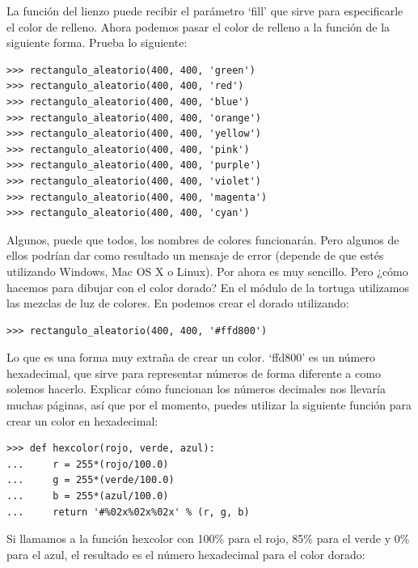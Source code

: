 La función  del lienzo puede recibir el parámetro `fill' que sirve para especificarle el color de relleno.  Ahora podemos pasar el color de relleno a la función de la siguiente forma. Prueba lo siguiente:

\begin{listing}
\begin{verbatim}
>>> rectangulo_aleatorio(400, 400, 'green')
>>> rectangulo_aleatorio(400, 400, 'red')
>>> rectangulo_aleatorio(400, 400, 'blue')
>>> rectangulo_aleatorio(400, 400, 'orange')
>>> rectangulo_aleatorio(400, 400, 'yellow')
>>> rectangulo_aleatorio(400, 400, 'pink')
>>> rectangulo_aleatorio(400, 400, 'purple')
>>> rectangulo_aleatorio(400, 400, 'violet')
>>> rectangulo_aleatorio(400, 400, 'magenta')
>>> rectangulo_aleatorio(400, 400, 'cyan')
\end{verbatim}
\end{listing}

Algunos, puede que todos, los nombres de colores funcionarán. Pero algunos de ellos podrían dar como resultado un mensaje de error (depende de que estés utilizando Windows, Mac OS X o Linux). Por ahora es muy sencillo. Pero ¿cómo hacemos para dibujar con el color dorado?  En el módulo de la tortuga utilizamos las mezclas de luz de colores.  En  podemos crear el dorado utilizando:

\begin{listing}
\begin{verbatim}
>>> rectangulo_aleatorio(400, 400, '#ffd800')
\end{verbatim}
\end{listing}

Lo que es una forma muy extraña de crear un color. `ffd800' es un número hexadecimal, que sirve para representar números de forma diferente a como solemos hacerlo.  Explicar cómo funcionan los números decimales nos llevaría muchas páginas, así que por el momento, puedes utilizar la siguiente función para crear un color en hexadecimal:

\begin{listing}
\begin{verbatim}
>>> def hexcolor(rojo, verde, azul):
...     r = 255*(rojo/100.0)
...     g = 255*(verde/100.0)
...     b = 255*(azul/100.0)
...     return '#%02x%02x%02x' % (r, g, b)
\end{verbatim}
\end{listing}

Si llamamos a la función hexcolor con 100\% para el rojo, 85\% para el verde y 0\% para el azul, el resultado es el número hexadecimal para el color dorado:

